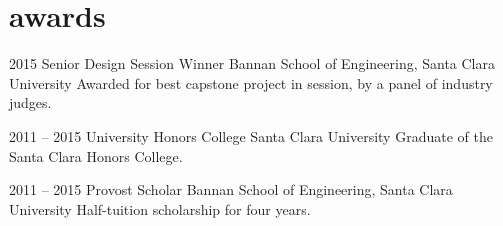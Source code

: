 \documentclass[]{friggeri-cv} %
\begin{document}

\section{awards}

\begin{entrylist}

\entry
{2015}
{Senior Design Session Winner}
{Bannan School of Engineering, Santa Clara University}
{Awarded for best capstone project in session, by a panel of industry judges.}

\entry
{2011 -- 2015}
{University Honors College}
{Santa Clara University}
{Graduate of the Santa Clara Honors College.}

\entry
{2011 -- 2015}
{Provost Scholar}
{Bannan School of Engineering, Santa Clara University}
{Half-tuition scholarship for four years.}


\end{entrylist}


%
\end{document}
